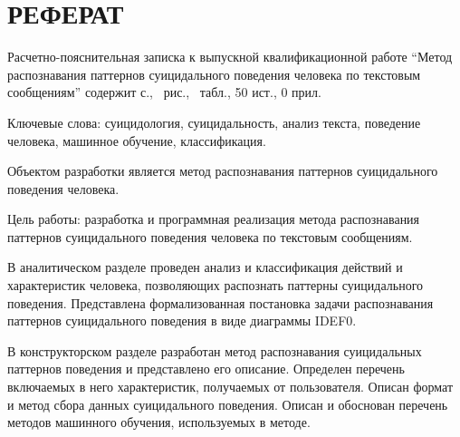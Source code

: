 \section*{РЕФЕРАТ}

Расчетно-пояснительная записка к выпускной квалификационной работе ``Метод распознавания паттернов суицидального поведения человека по текстовым сообщениям'' содержит \pageref{LastPage} с., \totalfigures\ рис., \totaltables\ табл., 50 ист., 0 прил.

Ключевые слова: суицидология, суицидальность, анализ текста, поведение человека, машинное обучение, классификация.

Объектом разработки является метод распознавания паттернов суицидального поведения человека.

Цель работы: разработка и программная реализация метода распознавания паттернов суицидального поведения человека по текстовым сообщениям.

В аналитическом разделе проведен анализ и классификация действий и характеристик человека, позволяющих распознать паттерны суицидального поведения. 
Представлена формализованная постановка задачи распознавания паттернов суицидального поведения в виде диаграммы IDEF0.


В конструкторском разделе разработан метод распознавания суицидальных паттернов поведения и представлено его описание.
Определен перечень включаемых в него характеристик, получаемых от пользователя.
Описан формат и метод сбора данных суицидального поведения.
Описан и обоснован перечень методов машинного обучения, используемых в методе.


